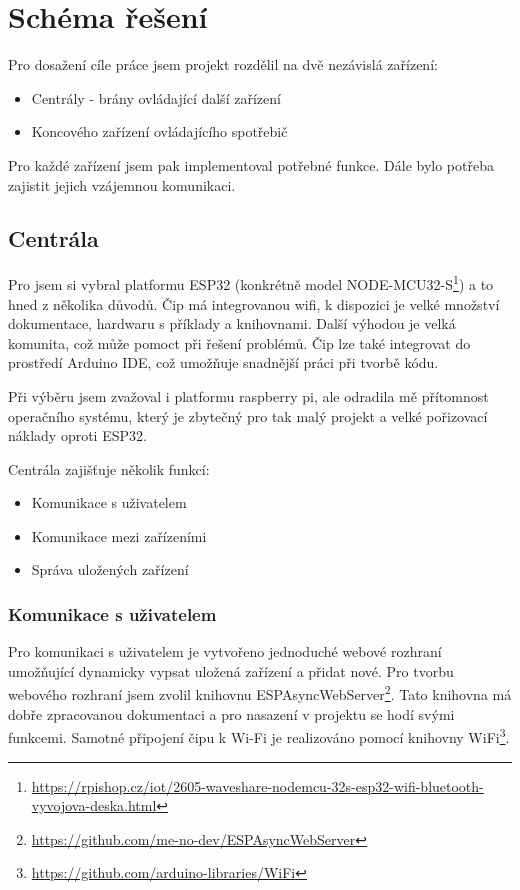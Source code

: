 \documentclass[11pt,a4paper,twoside,openright]{report}
\begin{document}
	\section{Schéma řešení}
	
	Pro dosažení cíle práce jsem projekt rozdělil na dvě nezávislá zařízení:
	
	\begin{itemize}
		\item Centrály - brány ovládající další zařízení
		\item Koncového zařízení ovládajícího spotřebič
	\end{itemize}
	
	Pro každé zařízení jsem pak implementoval potřebné funkce. Dále bylo potřeba zajistit jejich vzájemnou komunikaci.
	
	\subsection{Centrála}
	
	Pro  jsem  si vybral platformu ESP32 (konkrétně model NODE-MCU32-S\footnote{\url{https://rpishop.cz/iot/2605-waveshare-nodemcu-32s-esp32-wifi-bluetooth-vyvojova-deska.html}}) a to hned z několika důvodů. Čip má integrovanou wifi, k dispozici je velké množství dokumentace, hardwaru s příklady a knihovnami. Další výhodou je velká komunita, což může pomoct při řešení problémů. Čip lze také integrovat do prostředí Arduino IDE, což umožňuje snadnější práci při tvorbě kódu.
	
	
	Při výběru jsem zvažoval i platformu raspberry pi, ale odradila mě přítomnost operačního systému, který je zbytečný pro tak malý projekt a velké pořizovací náklady oproti ESP32.
	
	Centrála zajišťuje několik funkcí:
	\begin{itemize}
		\item Komunikace s uživatelem
		\item Komunikace mezi zařízeními
		\item Správa uložených zařízení
	\end{itemize}
	
	\subsubsection{Komunikace s uživatelem}
	
	Pro komunikaci s uživatelem je vytvořeno jednoduché webové rozhraní umožňující dynamicky vypsat uložená zařízení a přidat nové. Pro tvorbu webového rozhraní jsem zvolil knihovnu ESPAsyncWebServer\footnote{\url{https://github.com/me-no-dev/ESPAsyncWebServer}}. Tato knihovna má dobře zpracovanou dokumentaci a pro nasazení v projektu se hodí svými funkcemi. Samotné připojení čipu k Wi-Fi je realizováno pomocí knihovny WiFi\footnote{\url{https://github.com/arduino-libraries/WiFi}}.
	
\end{document}
